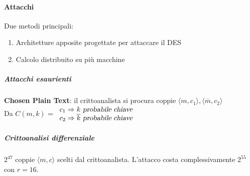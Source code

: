 \documentclass[10pt]{book}
\begin{document}
\paragraph{Attacchi} Due metodi principali:
\begin{enumerate}
	\item Architetture apposite progettate per attaccare il DES
	\item Calcolo distribuito su più macchine
\end{enumerate}
\subparagraph{Attacchi esaurienti}
\textbf{Chosen Plain Text}: il crittoanalista si procura coppie $\langle m, c_1\rangle, \langle \overline{m}, c_2\rangle$\\
Da $C(m, k)$ = $\begin{array}{l}
	c_1 \Rightarrow k \textsl{ probabile chiave}\\
	c_2 \Rightarrow \overline{k} \textsl{ probabile chiave}
\end{array}$
\subparagraph{Crittoanalisi differenziale} $2^{47}$ coppie $\langle m,c\rangle$ scelti dal crittoanalista. L'attacco costa complessivamente $2^{55}$ con $r=16$.
\end{document}
